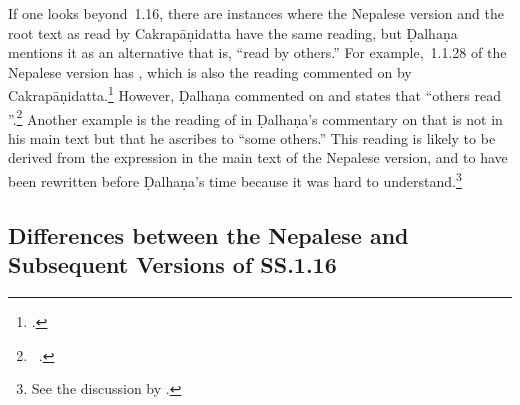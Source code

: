 If one looks beyond \SS\,1.16, there are instances where the Nepalese version and
the root text as read by Cakrapāṇidatta have the same reading, but Ḍalhaṇa
mentions it as an alternative that is, “read by others.” For example, \SS\,1.1.28
of the Nepalese version has , which is also the reading
commented on by Cakrapāṇidatta.\footcite[17]{acar-1939} However, Ḍalhaṇa commented
on  and states that “others read
”.\footnote{\SS\ .} %
    Another example is the reading of  in Ḍalhaṇa's
    commentary on  that is not in his main text but that he
    ascribes to “some others.” This reading is likely to be derived  from the
    expression  in the main text of the Nepalese version,
    and to have been rewritten before Ḍalhaṇa's time because it was hard to
    understand.\footnote{See the discussion by \citet[4--5]{birc-2021a}.}


\subsection{Differences between the Nepalese and Subsequent Versions of SS.1.16}


